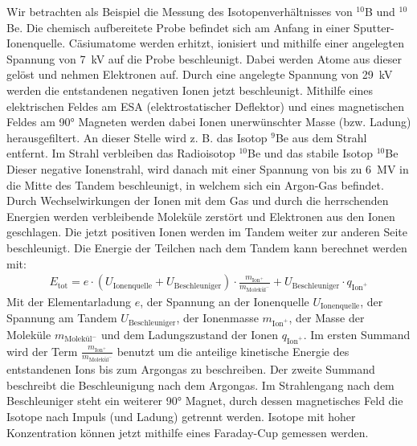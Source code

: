 Wir betrachten als Beispiel die Messung des Isotopenverhältnisses von $^{10}$B und $^{10}$Be.
Die chemisch aufbereitete Probe befindet sich am Anfang in einer Sputter-Ionenquelle.
Cäsiumatome werden erhitzt, ionisiert und mithilfe einer angelegten Spannung von \SI{7}{\kilo\volt} auf die Probe beschleunigt.
Dabei werden Atome aus dieser gelöst und nehmen Elektronen auf.
Durch eine angelegte Spannung von \SI{29}{\kilo\volt} werden die entstandenen negativen Ionen jetzt beschleunigt.
Mithilfe eines elektrischen Feldes am ESA (elektrostatischer Deflektor) und eines magnetischen Feldes am \ang{90} Magneten werden dabei Ionen unerwünschter Masse (bzw. Ladung) herausgefiltert.
An dieser Stelle wird z. B. das Isotop  $^{9}$Be aus dem Strahl entfernt.
Im Strahl verbleiben das Radioisotop $^{10}$Be und das stabile Isotop $^{10}$Be
Dieser negative Ionenstrahl, wird danach mit einer Spannung von bis zu \SI{6}{\mega\volt} in die Mitte des Tandem beschleunigt, in welchem sich ein Argon-Gas befindet.
Durch Wechselwirkungen der Ionen mit dem Gas und durch die herrschenden Energien werden verbleibende Moleküle zerstört und Elektronen aus den Ionen geschlagen.
Die jetzt positiven Ionen werden im Tandem weiter zur anderen Seite beschleunigt.
Die Energie der Teilchen nach dem Tandem kann berechnet werden mit:
\begin{gather}
    E_{\text{tot}} = e \cdot (U_{\text{Ionenquelle}} + U_{\text{Beschleuniger}}) \cdot \frac{m_{\text{Ion}^{+}}}{m_{\text{Molekül}^{-}}} + U_{\text{Beschleuniger}} \cdot q_{\text{Ion}^{+}}
    \label{Theo_Energie_nach_Beschleuniger}
\end{gather}
Mit der Elementarladung $e$, der Spannung an der Ionenquelle $U_{\text{Ionenquelle}}$, der Spannung am Tandem $U_{\text{Beschleuniger}}$, der Ionenmasse $m_{\text{Ion}^{+}}$, der Masse der Moleküle $m_{\text{Molekül}^{-}}$ und dem Ladungszustand der Ionen $q_{\text{Ion}^{+}}$.
Im ersten Summand wird der Term $\frac{m_{\text{Ion}^{+}}}{m_{\text{Molekül}^{-}}}$ benutzt um die anteilige kinetische Energie des entstandenen Ions bis zum Argongas zu beschreiben.
Der zweite Summand beschreibt die Beschleunigung nach dem Argongas.
Im Strahlengang nach dem Beschleuniger steht ein weiterer \ang{90} Magnet, durch dessen magnetisches Feld die Isotope nach Impuls (und Ladung) getrennt werden.
Isotope mit hoher Konzentration können jetzt mithilfe eines Faraday-Cup gemessen werden.

